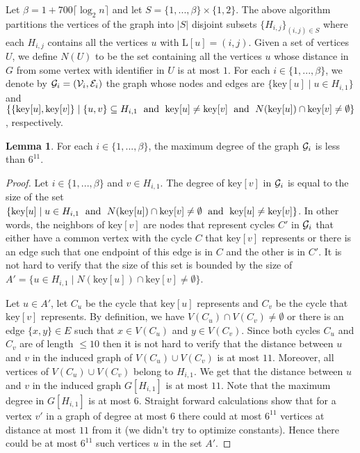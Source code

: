 \documentclass{article}
\theoremstyle{definition}
\newtheorem{lemma}{Lemma}[section]
\def\shiri#1{\textcolor{red}{[Shiri: #1]}}
\begin{document}
Let $\beta = 1 + 700\lceil \log_{2}n \rceil$ and let $S = \{1,...,\beta\} \times \{1,2\}$. The above algorithm partitions the vertices of the graph into $|S|$ disjoint subsets $\{H_{i,j}\}_{(i,j) \in S}$ where each $H_{i,j}$ contains all the vertices $u$ with $\text{L}[u] = (i,j)$. Given a set of vertices $U$, we define $N(U)$ to be the set containing all the vertices $u$ whose distance in $G$ from some vertex with identifier in $U$ is at most $1$. For each $i \in \{1, ..., \beta\}$, we denote by ${\cal G}_{i} = ({\cal V}_{i},{\cal E}_{i})$ the graph whose nodes and edges are $\{\text{key}[u] \mid u \in H_{i,1}\}$ and $\{\{\text{key}[u], \text{key}[v]\}\mid \{u,v\} \subseteq H_{i,1} \text{\; and \;} \text{key}[u] \ne \text{key}[v] \text{\; and \;} N(\text{key}[u]) \cap \text{key}[v] \ne \emptyset  \}$, respectively.

\begin{lemma}  For each $i \in \{1, ..., \beta\}$, the maximum degree of the graph ${\cal G}_{i}$ is less than $6^{11}$. \label{lem:degreeSuperGraph6}\end{lemma}
\begin{proof} Let $i \in \{1, ..., \beta\}$ and $v \in H_{i,1}$. The degree of $\text{key}[v]$ in ${\cal G}_{i}$ is equal to the size of the set $\{\text{key}[u] \mid u \in H_{i,1} \text{\; and \;} N(\text{key}[u]) \cap \text{key}[v] \ne \emptyset  \text{\; and \;} \text{key}[u] \ne \text{key}[v]\}$.
In other words, the neighbors of $\text{key}[v]$ are nodes that represent cycles $C'$ in ${\cal G}_{i}$ that either have a common vertex with the cycle $C$ that $\text{key}[v]$ represents or there is an edge such that one endpoint of this edge is in $C$ and the other is in $C'$.
It is not hard to verify that the size of this set is bounded by the size of $A' = \{u \in H_{i,1} \mid N(\text{key}[u]) \cap \text{key}[v] \ne \emptyset\}$.

Let $u \in A'$, let $C_u$ be the cycle that $\text{key}[u]$ represents and $C_v$ be the cycle that $\text{key}[v]$ represents.
By definition, we have $V(C_u) \cap V(C_v) \neq \emptyset$ or there is an edge $\{x,y\} \in E$ such that $x \in V(C_u)$ and $y \in V(C_v)$.
Since both cycles  $C_u$ and $C_v$ are of length $\le 10$ then it is not hard to verify that the distance between $u$ and $v$ in the induced graph of
$V(C_u) \cup V(C_v)$ is at most $11$.
Moreover, all vertices of $V(C_u) \cup V(C_v)$ belong to $H_{i,1}$.
We get that the distance between $u$ and $v$ in the induced graph $G[H_{i,1}]$ is at most $11$.
Note that the maximum degree in $G[H_{i,1}]$ is at most $6$.
Straight forward calculations show that for a vertex $v'$ in a graph of degree at most $6$ there could at most $6^{11}$ vertices at distance at most $11$ from it (we didn't try to optimize constants). Hence there could be at most $6^{11}$ such vertices $u$ in the set $A'$.\end{proof}
\end{document}
